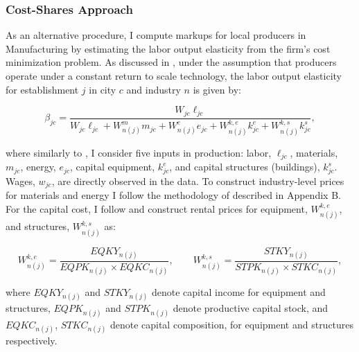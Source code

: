 \newpage

\subsubsection{Cost-Shares Approach}
As an alternative procedure, I compute markups for local producers in Manufacturing by estimating the labor output elasticity from the firm's cost minimization problem. As discussed in \textcite{DeLoecker&Syverson21}, under the assumption that producers operate under a constant return to scale technology, the labor output elasticity for establishment $j$ in city $c$ and industry $n$ is given by:

\begin{equation}\label{eq:betacs}
	\beta_{j c} = \frac{W_{jc} \ell_{jc}}{W_{jc} \ell_{jc} + W^{m}_{n(j)} m_{jc} + W^{e}_{n(j)}e_{jc} + W^{k,e}_{n(j)} k^{e}_{jc} + W^{k,s}_{n(j)} k^s_{jc}},
\end{equation}

where similarly to \textcite{FosterHaltiwanger&Tuttle22}, I consider five inputs in production: labor, $\ell_{jc}$, materials, $m_{jc}$, energy, $e_{jc}$, capital equipment, $k^{e}_{jc}$, and capital structures (buildings), $k^{s}_{jc}$. Wages, $w_{jc}$, are directly observed in the data. To construct industry-level prices for materials and energy I follow the methodology of \textcite{FosterHaltiwanger&Tuttle22} described in Appendix B. For the capital cost, I follow \textcite{FosterGrim&Haltiwanger16} and construct rental prices for equipment, $W^{k,e}_{n(j)}$, and structures, $W^{k,s}_{n(j)}$ as:

\begin{equation*}
	W^{k,e}_{n(j)} = \frac{EQKY_{n(j)}}{EQPK_{n(j)} \times EQKC_{n(j)}}, \qquad W^{k,s}_{n(j)} = \frac{STKY_{n(j)}}{STPK_{n(j)} \times STKC_{n(j)}},
\end{equation*}

where $EQKY_{n(j)}$ and $STKY_{n(j)}$ denote capital income for equipment and structures, $EQPK_{n(j)}$ and $STPK_{n(j)}$ denote productive capital stock, and $EQKC_{n(j)}$, $STKC_{n(j)}$ denote capital composition, for equipment and structures respectively.

